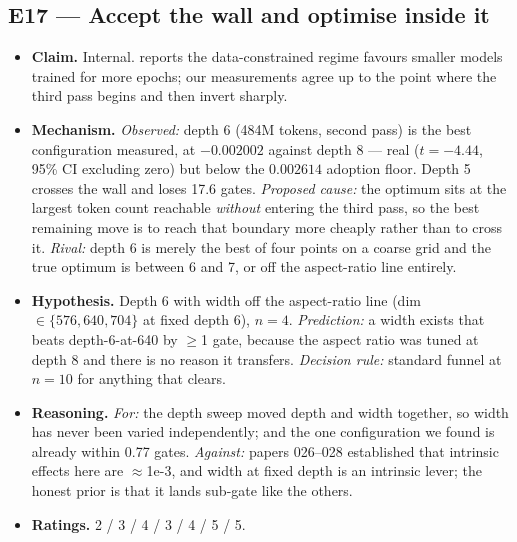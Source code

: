 \documentclass{article}
\begin{document}
\subsection{E17 --- Accept the wall and optimise inside it}
\begin{itemize}\itemsep2pt
\item \textbf{Claim.} Internal. \citet{dc2026} reports the data-constrained regime favours smaller models trained for more epochs; our measurements agree up to the point where the third pass begins and then invert sharply.
\item \textbf{Mechanism.} \emph{Observed:} depth 6 (484M tokens, second pass) is the best configuration measured, at $-0.002002$ against depth 8 --- real ($t{=}-4.44$, 95\% CI excluding zero) but below the $0.002614$ adoption floor. Depth 5 crosses the wall and loses 17.6 gates. \emph{Proposed cause:} the optimum sits at the largest token count reachable \emph{without} entering the third pass, so the best remaining move is to reach that boundary more cheaply rather than to cross it. \emph{Rival:} depth 6 is merely the best of four points on a coarse grid and the true optimum is between 6 and 7, or off the aspect-ratio line entirely.
\item \textbf{Hypothesis.} Depth 6 with width off the aspect-ratio line (dim $\in \{576, 640, 704\}$ at fixed depth 6), $n{=}4$. \emph{Prediction:} a width exists that beats depth-6-at-640 by $\ge$1 gate, because the aspect ratio was tuned at depth 8 and there is no reason it transfers. \emph{Decision rule:} standard funnel at $n{=}10$ for anything that clears.
\item \textbf{Reasoning.} \emph{For:} the depth sweep moved depth and width together, so width has never been varied independently; and the one configuration we found is already within 0.77 gates. \emph{Against:} papers 026--028 established that intrinsic effects here are $\approx$1e-3, and width at fixed depth is an intrinsic lever; the honest prior is that it lands sub-gate like the others.
\item \textbf{Ratings.} 2 / 3 / 4 / 3 / 4 / 5 / 5.
\end{itemize}
\end{document}
